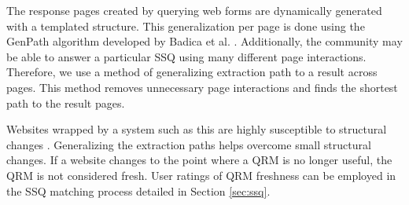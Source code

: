 
The response pages created by querying web forms are dynamically
generated with a templated structure. This generalization per page is
done using the GenPath algorithm developed by Badica et
al. \cite{Badica06}. Additionally, the community may be able to answer
a particular SSQ using many different page interactions. Therefore, we
use a method of generalizing extraction path to a result across
pages. This method removes unnecessary page interactions and finds the
shortest path to the result pages.

Websites wrapped by a system such as this are highly susceptible to
structural changes \cite{TanZMG07}. Generalizing the extraction paths
helps overcome small structural changes. If a website changes to the
point where a QRM is no longer useful, the QRM is not considered
fresh. User ratings of QRM freshness can be employed in the SSQ matching
process detailed in Section \ref{sec:ssq}.


